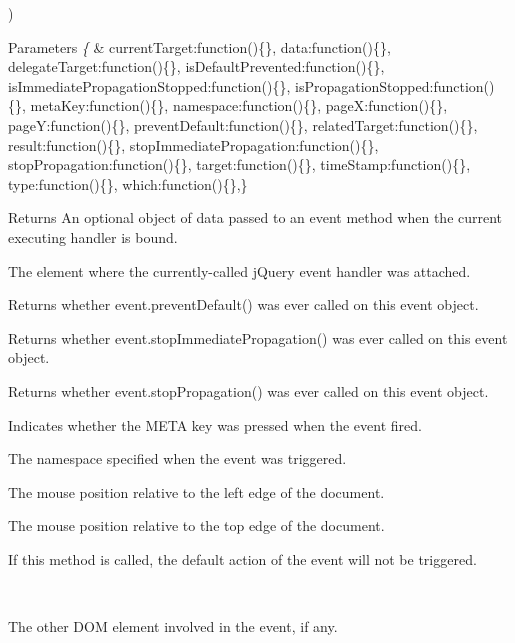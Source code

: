 {\begin{DoxyParamCaption}
\end{DoxyParamCaption}
)}\label{jquery-1_810_82_8intellisense_8js_a55098c3abe028707512d17d570d3486b}

\begin{DoxyParams}{Parameters}
{\em \{} & \textquotesingle{}current\+Target\textquotesingle{}\+:function()\{\}, \textquotesingle{}data\textquotesingle{}\+:function()\{\}, \textquotesingle{}delegate\+Target\textquotesingle{}\+:function()\{\}, \textquotesingle{}is\+Default\+Prevented\textquotesingle{}\+:function()\{\}, \textquotesingle{}is\+Immediate\+Propagation\+Stopped\textquotesingle{}\+:function()\{\}, \textquotesingle{}is\+Propagation\+Stopped\textquotesingle{}\+:function()\{\}, \textquotesingle{}meta\+Key\textquotesingle{}\+:function()\{\}, \textquotesingle{}namespace\textquotesingle{}\+:function()\{\}, \textquotesingle{}page\+X\textquotesingle{}\+:function()\{\}, \textquotesingle{}page\+Y\textquotesingle{}\+:function()\{\}, \textquotesingle{}prevent\+Default\textquotesingle{}\+:function()\{\}, \textquotesingle{}related\+Target\textquotesingle{}\+:function()\{\}, \textquotesingle{}result\textquotesingle{}\+:function()\{\}, \textquotesingle{}stop\+Immediate\+Propagation\textquotesingle{}\+:function()\{\}, \textquotesingle{}stop\+Propagation\textquotesingle{}\+:function()\{\}, \textquotesingle{}target\textquotesingle{}\+:function()\{\}, \textquotesingle{}time\+Stamp\textquotesingle{}\+:function()\{\}, \textquotesingle{}type\textquotesingle{}\+:function()\{\}, \textquotesingle{}which\textquotesingle{}\+:function()\{\},\} \begin{DoxyReturn}{Returns}
An optional object of data passed to an event method when the current executing handler is bound.

The element where the currently-\/called j\+Query event handler was attached.

Returns whether event.\+prevent\+Default() was ever called on this event object.

Returns whether event.\+stop\+Immediate\+Propagation() was ever called on this event object.

Returns whether event.\+stop\+Propagation() was ever called on this event object.

Indicates whether the M\+E\+T\+A key was pressed when the event fired.

The namespace specified when the event was triggered.

The mouse position relative to the left edge of the document.

The mouse position relative to the top edge of the document.

If this method is called, the default action of the event will not be triggered.
\end{DoxyReturn}
\\
\hline
\end{DoxyParams}
The other D\+O\+M element involved in the event, if any.

